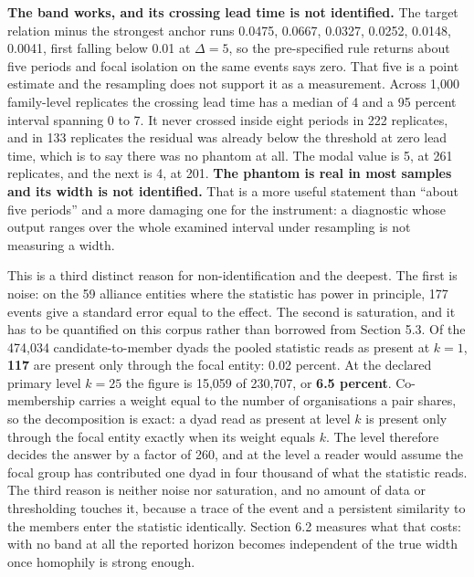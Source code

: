 \documentclass[twoside,11pt]{article}
\begin{document}
\textbf{The band works, and its crossing lead time is not identified.} The target relation minus the strongest anchor runs 0.0475, 0.0667, 0.0327, 0.0252, 0.0148, 0.0041, first falling below 0.01 at \(\Delta = 5\), so the pre-specified rule returns about five periods and focal isolation on the same events says zero. That five is a point estimate and the resampling does not support it as a measurement. Across 1,000 family-level replicates the crossing lead time has a median of 4 and a 95 percent interval spanning 0 to 7. It never crossed inside eight periods in 222 replicates, and in 133 replicates the residual was already below the threshold at zero lead time, which is to say there was no phantom at all. The modal value is 5, at 261 replicates, and the next is 4, at 201. \textbf{The phantom is real in most samples and its width is not identified.} That is a more useful statement than ``about five periods'' and a more damaging one for the instrument: a diagnostic whose output ranges over the whole examined interval under resampling is not measuring a width.

This is a third distinct reason for non-identification and the deepest. The first is noise: on the 59 alliance entities where the statistic has power in principle, 177 events give a standard error equal to the effect. The second is saturation, and it has to be quantified on this corpus rather than borrowed from Section 5.3. Of the 474,034 candidate-to-member dyads the pooled statistic reads as present at \(k = 1\), \textbf{117} are present only through the focal entity: 0.02 percent. At the declared primary level \(k = 25\) the figure is 15,059 of 230,707, or \textbf{6.5 percent}. Co-membership carries a weight equal to the number of organisations a pair shares, so the decomposition is exact: a dyad read as present at level \(k\) is present only through the focal entity exactly when its weight equals \(k\). The level therefore decides the answer by a factor of 260, and at the level a reader would assume the focal group has contributed one dyad in four thousand of what the statistic reads. The third reason is neither noise nor saturation, and no amount of data or thresholding touches it, because a trace of the event and a persistent similarity to the members enter the statistic identically. Section 6.2 measures what that costs: with no band at all the reported horizon becomes independent of the true width once homophily is strong enough.
\end{document}
